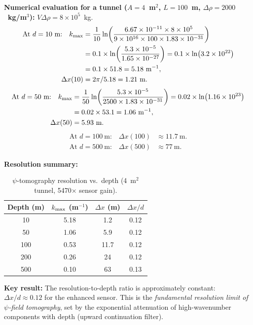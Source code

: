 \documentclass[aps,prd,twocolumn,superscriptaddress,nofootinbib]{revtex4-2}
\begin{document}
\textbf{Numerical evaluation for a tunnel ($A = 4$~m$^2$, $L = 100$~m,
$\Delta\rho = 2000$~kg/m$^3$):}
$V\Delta\rho = 8\times10^5$~kg.
\begin{align}
\text{At } d = 10~\text{m:}\quad
k_{\rm max} &= \frac{1}{10}\ln\!\left(\frac{6.67\times10^{-11}
\times 8\times10^5}{9\times10^{16}\times 100\times 1.83\times10^{-31}}
\right) \nonumber\\
&= 0.1\times\ln\!\left(\frac{5.3\times10^{-5}}{1.65\times10^{-27}}\right)
= 0.1\times\ln(3.2\times10^{22}) \nonumber\\
&= 0.1\times 51.8 = 5.18~\text{m}^{-1}, \nonumber\\
\Delta x(10) &= 2\pi/5.18 = 1.21~\text{m}.
\label{eq:res-10m}
\end{align}
\begin{align}
\text{At } d = 50~\text{m:}\quad
k_{\rm max} &= \frac{1}{50}\ln\!\left(\frac{5.3\times10^{-5}}
{2500\times 1.83\times10^{-31}}\right)
= 0.02\times\ln(1.16\times10^{23}) \nonumber\\
&= 0.02\times 53.1 = 1.06~\text{m}^{-1}, \nonumber\\
\Delta x(50) &= 5.93~\text{m}.
\end{align}
\begin{align}
\text{At } d = 100~\text{m:}\quad
\Delta x(100) &\approx 11.7~\text{m}. \\
\text{At } d = 500~\text{m:}\quad
\Delta x(500) &\approx 77~\text{m}.
\end{align}

\textbf{Resolution summary:}

\begin{table}[h]
\caption{$\psi$-tomography resolution vs.\ depth (4~m$^2$ tunnel,
5470$\times$ sensor gain).}
\begin{ruledtabular}
\begin{tabular}{cccc}
Depth (m) & $k_{\rm max}$ (m$^{-1}$) & $\Delta x$ (m) &
$\Delta x/d$ \\
\hline
10 & 5.18 & 1.2 & 0.12 \\
50 & 1.06 & 5.9 & 0.12 \\
100 & 0.53 & 11.7 & 0.12 \\
200 & 0.26 & 24 & 0.12 \\
500 & 0.10 & 63 & 0.13 \\
\end{tabular}
\end{ruledtabular}
\end{table}

\textbf{Key result:} The resolution-to-depth ratio is approximately
constant: $\Delta x/d \approx 0.12$ for the enhanced sensor.  This
is the \emph{fundamental resolution limit of $\psi$-field tomography},
set by the exponential attenuation of high-wavenumber components with
depth (upward continuation filter).
\end{document}
